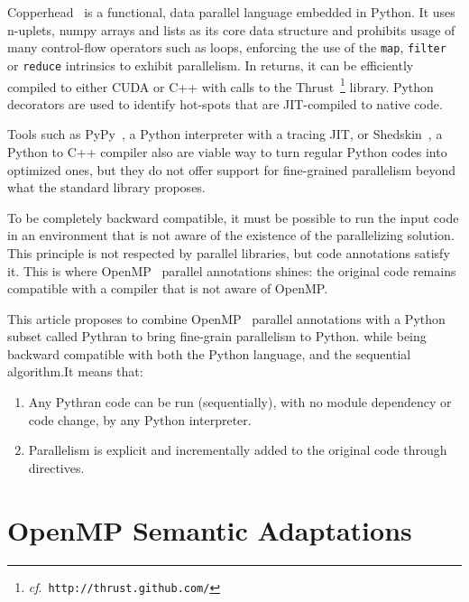 \documentclass{llncs}
\begin{document}
Copperhead~\cite{copperhead2011} is a functional, data parallel language embedded in
Python. It uses n-uplets, numpy arrays and lists as its core data structure and
prohibits usage of many control-flow operators such as loops, enforcing the use
of the \texttt{map}, \texttt{filter} or \texttt{reduce} intrinsics to exhibit
parallelism. In returns, it can be efficiently compiled to either CUDA or C++
with calls to the Thrust~\footnote{\emph{cf}.\
\texttt{http://thrust.github.com/}} library. Python decorators are used to
identify hot-spots that are JIT-compiled to native code.

Tools such as PyPy~\cite{pypy2009}, a Python interpreter with a tracing JIT, or
Shedskin~\cite{shedskin2006}, a Python to C++ compiler also are viable way to
turn regular Python codes into optimized ones, but they do not offer support for
fine-grained parallelism beyond what the standard library
proposes.

To be completely backward compatible, it must be possible to run the input code
in an environment that is not aware of the existence of the parallelizing
solution. This principle is not respected by parallel libraries, but code
annotations satisfy it. This is where  OpenMP~\cite{openmp3.1} parallel
annotations shines: the original code remains compatible with a compiler that is
not aware of OpenMP.

This article proposes to combine OpenMP~\cite{openmp3.1} parallel annotations
with a Python subset called Pythran to bring fine-grain parallelism to Python.
while being backward compatible with both the Python language, and the
sequential algorithm.It means that:
%
\begin{enumerate}
    \item Any Pythran code can be run (sequentially), with no module dependency or code change,
        by any Python interpreter.
    \item Parallelism is explicit and incrementally added to the original code
        through directives.
\end{enumerate}

\section{OpenMP Semantic Adaptations}\label{sec:python-openmp}
\end{document}
